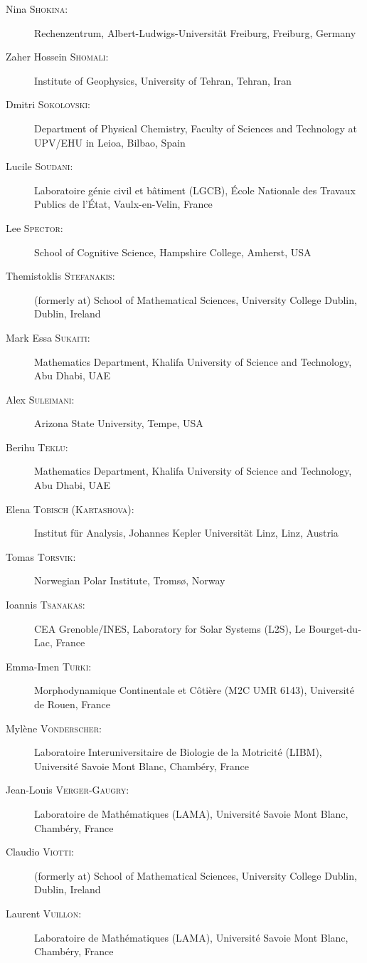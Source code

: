 \begin{description}
  \item[Nina \textsc{Shokina}:] Rechenzentrum, Albert-Ludwigs-Universit\"at Freiburg, Freiburg, Germany
  \item[Zaher Hossein \textsc{Shomali}:] Institute of Geophysics, University of Tehran, Tehran, Iran
  \item[Dmitri \textsc{Sokolovski}:] Department of Physical Chemistry, Faculty of Sciences and Technology at UPV/EHU in Leioa, Bilbao, Spain
  \item[Lucile \textsc{Soudani}:] Laboratoire g\'enie civil et b\^atiment (LGCB), \'Ecole Nationale des Travaux Publics de l'\'Etat, Vaulx-en-Velin, France
  \item[Lee \textsc{Spector}:] School of Cognitive Science, Hampshire College, Amherst, USA
  \item[Themistoklis \textsc{Stefanakis}:] (formerly at) School of Mathematical Sciences, University College Dublin, Dublin, Ireland
  \item[Mark Essa \textsc{Sukaiti}:] Mathematics Department, Khalifa University of Science and Technology, Abu Dhabi, UAE
  \item[Alex \textsc{Suleimani}:] Arizona State University, Tempe, USA
  \item[Berihu \textsc{Teklu}:] Mathematics Department, Khalifa University of Science and Technology, Abu Dhabi, UAE
  \item[Elena \textsc{Tobisch} (\textsc{Kartashova}):] Institut f\"ur Analysis, Johannes Kepler Universit\"at Linz, Linz, Austria
  \item[Tomas \textsc{Torsvik}:] Norwegian Polar Institute, Troms\o, Norway
  \item[Ioannis \textsc{Tsanakas}:] CEA Grenoble/INES, Laboratory for Solar Systems (L2S), Le Bourget-du-Lac, France
  \item[Emma-Imen \textsc{Turki}:] Morphodynamique Continentale et C\^oti\`ere (M2C UMR 6143), Universit\'e de Rouen, France
  \item[Myl\`ene \textsc{Vonderscher}:] Laboratoire Interuniversitaire de Biologie de la Motricit\'e (LIBM), Universit\'e Savoie Mont Blanc, Chamb\'ery, France
  \item[Jean-Louis \textsc{Verger-Gaugry}:] Laboratoire de Math\'ematiques (LAMA), Universit\'e Savoie Mont Blanc, Chamb\'ery, France
  \item[Claudio \textsc{Viotti}:] (formerly at) School of Mathematical Sciences, University College Dublin, Dublin, Ireland
  \item[Laurent \textsc{Vuillon}:] Laboratoire de Math\'ematiques (LAMA), Universit\'e Savoie Mont Blanc, Chamb\'ery, France

\end{description}
